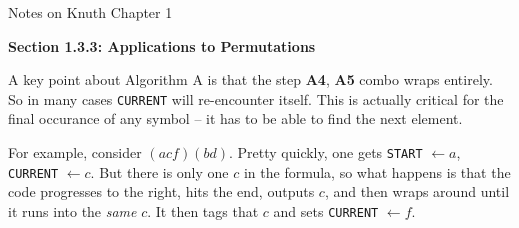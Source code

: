 \topglue 0.5in
\centerline{Notes on Knuth Chapter 1}
\vskip 0.5in

\noindent\centerline{{\bf Section 1.3.3: Applications to Permutations}}
\vskip 0.2in
 A key point about Algorithm A is that the step {\bf A4},
{\bf A5} combo wraps entirely.  So in many cases {\tt CURRENT} will
re-encounter itself.  This is actually critical for the final occurance of
any symbol -- it has to be able to find the next element.  

For example,
consider $\left(a c f\right)\left(b d\right)$.  Pretty quickly, one gets
{\tt START} $\gets a$, {\tt CURRENT} $\gets c$.  But there is only one $c$
in the formula, so what happens is that the code progresses to the right,
hits the end, outputs $c$, and then wraps around until it runs into the 
{\it same} $c$.  It then tags that $c$ and sets {\tt CURRENT} $\gets f$.

